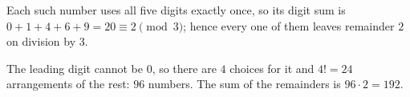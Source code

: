 Each such number uses all five digits exactly once, so its digit sum is $0+1+4+6+9=20\equiv2\pmod3$; hence every one of them leaves remainder $2$ on division by $3$.

The leading digit cannot be $0$, so there are $4$ choices for it and $4!=24$ arrangements of the rest: $96$ numbers. The sum of the remainders is $96\cdot2=\boxed{192}$.

